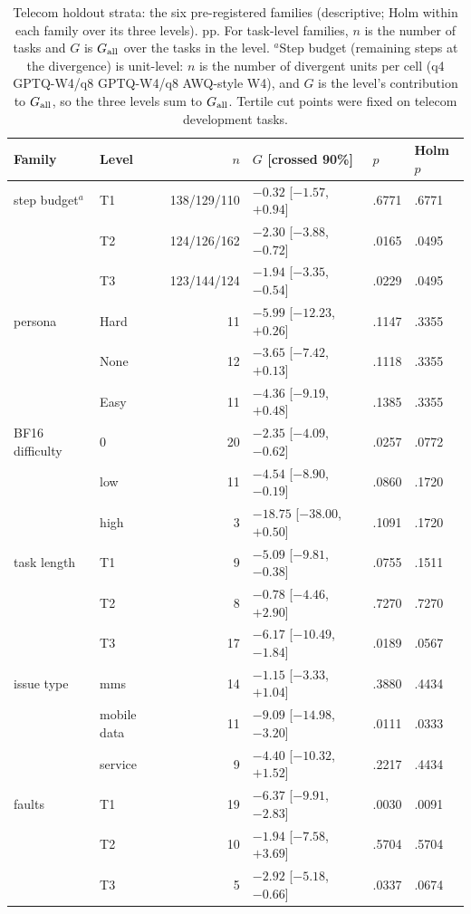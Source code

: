 \begin{table}[t]
\centering%
\renewcommand{\arraystretch}{1.12}\fontsize{8.5}{10}\selectfont\setlength{\tabcolsep}{4pt}
\begin{tabular}{@{}llrlll@{}}
\toprule
Family & Level & $n$ & $G$ [crossed 90\%] & $p$ & Holm $p$ \\
\midrule
step budget$^a$ & T1 & 138/129/110 & $-0.32$ [$-1.57$, $+0.94$] & .6771 & .6771 \\
 & T2 & 124/126/162 & $-2.30$ [$-3.88$, $-0.72$] & .0165 & .0495 \\
 & T3 & 123/144/124 & $-1.94$ [$-3.35$, $-0.54$] & .0229 & .0495 \\
\midrule
persona & Hard & 11 & $-5.99$ [$-12.23$, $+0.26$] & .1147 & .3355 \\
 & None & 12 & $-3.65$ [$-7.42$, $+0.13$] & .1118 & .3355 \\
 & Easy & 11 & $-4.36$ [$-9.19$, $+0.48$] & .1385 & .3355 \\
\midrule
BF16 difficulty & 0 & 20 & $-2.35$ [$-4.09$, $-0.62$] & .0257 & .0772 \\
 & low & 11 & $-4.54$ [$-8.90$, $-0.19$] & .0860 & .1720 \\
 & high & 3 & $-18.75$ [$-38.00$, $+0.50$] & .1091 & .1720 \\
\midrule
task length & T1 & 9 & $-5.09$ [$-9.81$, $-0.38$] & .0755 & .1511 \\
 & T2 & 8 & $-0.78$ [$-4.46$, $+2.90$] & .7270 & .7270 \\
 & T3 & 17 & $-6.17$ [$-10.49$, $-1.84$] & .0189 & .0567 \\
\midrule
issue type & mms & 14 & $-1.15$ [$-3.33$, $+1.04$] & .3880 & .4434 \\
 & mobile data & 11 & $-9.09$ [$-14.98$, $-3.20$] & .0111 & .0333 \\
 & service & 9 & $-4.40$ [$-10.32$, $+1.52$] & .2217 & .4434 \\
\midrule
faults & T1 & 19 & $-6.37$ [$-9.91$, $-2.83$] & .0030 & .0091 \\
 & T2 & 10 & $-1.94$ [$-7.58$, $+3.69$] & .5704 & .5704 \\
 & T3 & 5 & $-2.92$ [$-5.18$, $-0.66$] & .0337 & .0674 \\
\bottomrule
\end{tabular}
\caption{Telecom holdout strata: the six pre-registered families (descriptive; Holm within each family over its three levels). pp. For task-level families, $n$ is the number of tasks and $G$ is $G_{\mathrm{all}}$ over the tasks in the level. $^a$Step budget (remaining steps at the divergence) is unit-level: $n$ is the number of divergent units per cell (q4 GPTQ-W4/q8 GPTQ-W4/q8 AWQ-style W4), and $G$ is the level's contribution to $G_{\mathrm{all}}$, so the three levels sum to $G_{\mathrm{all}}$. Tertile cut points were fixed on telecom development tasks.}
\label{tab:strata}
\end{table}



